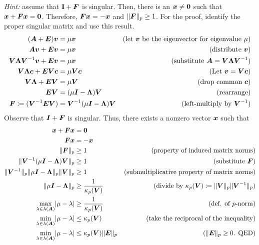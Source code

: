 \documentclass[twoside,10pt]{article}
\begin{document}
\emph{Hint:} assume that $\mathbf{I} + \bm{F}$ is singular. Then, there is an $\bm{x} \neq \bm{0}$ such that $\bm{x} + \bm{F}\bm{x} = \bm{0}$.
Therefore, $\bm{F} \bm{x} = -\bm{x}$ and $\|\bm{F}\|_{p} \geq 1$. 
For the proof, identify the proper singular matrix and use this result. 
\begin{align*}
  (\bm{A} + \bm{E})\bm{v} &= \mu\bm{v}&\text{(let $\bm{v}$ be the eigenvector for eigenvalue $\mu$)}\\
  \bm{A}\bm{v} + \bm{E}\bm{v} &= \mu\bm{v}&\text{(distribute $\bm{v}$)}\\
  \bm{V}\bm{\Lambda}\bm{V}^{-1}\bm{v} + \bm{E}\bm{v} &= \mu\bm{v}&\text{(substitute $\bm{A} = \bm{V} \bm{\Lambda} \bm{V}^{-1}$)}\\
  \bm{V}\bm{\Lambda}\bm{c} + \bm{E}\bm{V}\bm{c} &= \mu\bm{V}\bm{c}&\text{(Let $\bm{v} = \bm{V}\bm{c}$)}\\
  \bm{V}\bm{\Lambda} + \bm{E}\bm{V} &= \mu\bm{V}&\text{(drop common $\bm{c}$)}\\
  \bm{E}\bm{V} &= (\mu\bm{I} - \bm{\Lambda})\bm{V}&\text{(rearrange)}\\
  \bm{F} \coloneqq (\bm{V}^{-1}\bm{E}\bm{V}) &= \bm{V}^{-1}(\mu\bm{I} - \bm{\Lambda})\bm{V}&\text{(left-multiply by $\bm{V}^{-1}$)}\\
\end{align*}
Observe that $\bm{I} + \bm{F}$ is singular.
Thus, there exists a nonzero vector $\bm{x}$ such that
\begin{align*}
  \vct{x} + \mtx{F}\vct{x} &= \vct{0}\\
  \mtx{F}\vct{x} &= -\vct{x}\\
  \|\mtx{F}\|_p &\geq 1&\text{(property of induced matrix norms)}\\
  \|\mtx{V}^{-1}(\mu\mtx{I} - \mtx{\Lambda})\mtx{V}\|_p &\geq 1&\text{(substitute $\mtx{F}$)}\\
  \|\mtx{V}^{-1}\|_p \|\mu\mtx{I} - \mtx{\Lambda}\|_p \|\mtx{V}\|_p &\geq 1&\text{(submultiplicative property of matrix norms)}\\
  \|\mu\mtx{I} - \mtx{\Lambda}\|_p &\geq \frac{1}{\kappa_p(\mtx{V})}&\text{(divide by $ \kappa_p(\mtx{V}) \coloneqq \|\mtx{V}\|_p \|\mtx{V}^{-1}\|_p$)}\\
  \max_{\lambda \in \lambda(\mtx{A})} \left|\mu - \lambda\right| &\geq \frac{1}{\kappa_p(\mtx{V})}&\text{(def. of $p$-norm)}\\
  \min_{\lambda \in \lambda(\mtx{A})} \left|\mu - \lambda\right| &\leq \kappa_p(\mtx{V})&\text{(take the reciprocal of the inequality)}\\
  \min_{\lambda \in \lambda(\mtx{A})} \left|\mu - \lambda\right| &\leq \kappa_p(\mtx{V})\|\mtx{E}\|_p&\text{($\|\mtx{E}\|_p \geq 0$. QED)}
\end{align*}
\end{document}
